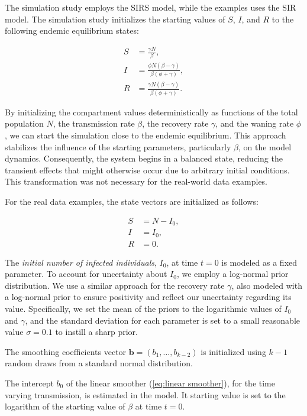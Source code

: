 \documentclass[
11pt, %
oneside, %
english, %
singlespacing, %
]{macthesis} %
\begin{document}
The simulation study employs the SIRS model, while the examples uses the SIR model. The simulation study initializes the starting values of \(S\), \(I\), and \(R\) to the following endemic equilibrium states:

\[
\begin{aligned}
S &= \frac{\gamma N}{\beta}, \\
I &= \frac{\phi N (\beta - \gamma)}{\beta(\phi + \gamma)}, \\
R &= \frac{\gamma N (\beta - \gamma)}{\beta (\phi + \gamma)}.
\end{aligned}
\]

By initializing the compartment values deterministically as functions of the total population \(N\), the transmission rate \(\beta\), the recovery rate \(\gamma\), and the waning rate \(\phi\), we can start the simulation close to the endemic equilibrium. This approach stabilizes the influence of the starting parameters, particularly \(\beta\), on the model dynamics. Consequently, the system begins in a balanced state, reducing the transient effects that might otherwise occur due to arbitrary initial conditions. This transformation was not necessary for the real-world data examples.

For the real data examples, the state vectors are initialized as follows:

\[
\begin{aligned}
S &= N - I_0, \\
I &= I_0, \\
R &= 0.
\end{aligned}
\]

The \emph{initial number of infected individuals}, \(I_0\), at time \(t=0\) is modeled as a fixed parameter. To account for uncertainty about \(I_0\), we employ a log-normal prior distribution. We use a similar approach for the recovery rate \(\gamma\), also modeled with a log-normal prior to ensure positivity and reflect our uncertainty regarding its value. Specifically, we set the mean of the priors to the logarithmic values of \(I_0\) and \(\gamma\), and the standard deviation for each parameter is set to a small reasonable value \(\sigma = 0.1\) to instill a sharp prior.

The smoothing coefficients vector \(\mathbf{b} = (b_1, \ldots, b_{k-2})\) is initialized using \(k-1\) random draws from a standard normal distribution.

The intercept \(b_0\) of the linear smoother (\ref{eq:linear smoother}), for the time varying transmission, is estimated in the model. It starting value is set to the logarithm of the starting value of \(\beta\) at time \(t= 0\).
\end{document}
